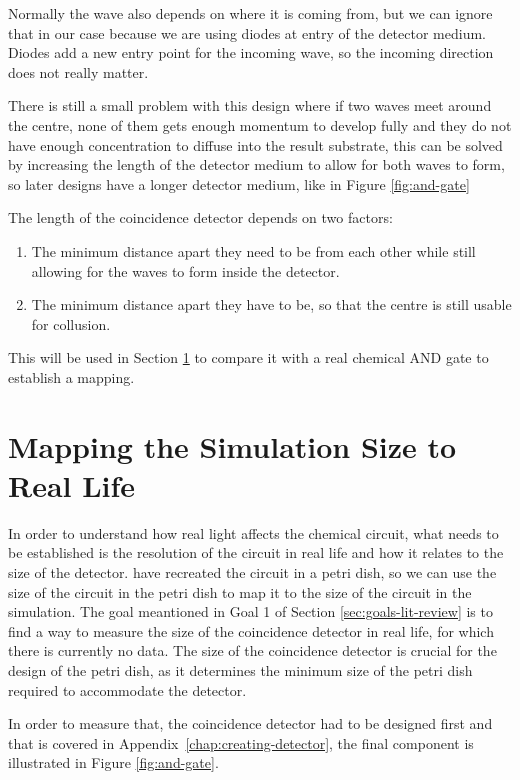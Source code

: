 Normally the wave also depends on where it is coming from, but we can ignore that in our case because we are using diodes at entry of the detector medium. Diodes add a new entry point for the incoming wave, so the incoming direction does not really matter. 

There is still a small problem with this design where if two waves meet around the centre, none of them gets enough momentum to develop fully and they do not have enough concentration to diffuse into the result substrate, this can be solved by increasing the length of the detector medium to allow for both waves to form, so later designs have a longer detector medium, like in Figure \ref{fig:and-gate}

The length of the coincidence detector depends on two factors:
\begin{enumerate}
    \item The minimum distance apart they need to be from each other while still allowing for the waves to form inside the detector.
    \item The minimum distance apart they have to be, so that the centre is still usable for collusion.
\end{enumerate}

This will be used in Section \ref{sec:mapping-simulation-to-real-life} to compare it with a real chemical AND gate to establish a mapping.

\section{Mapping the Simulation Size to Real Life} \label{sec:mapping-simulation-to-real-life}
In order to understand how real light affects the chemical circuit, what needs to be established is the resolution of the circuit in real life and how it relates to the size of the detector. \cite{gorecki2003chemical} have recreated the circuit in a petri dish, so we can use the size of the circuit in the petri dish to map it to the size of the circuit in the simulation.
The goal meantioned in Goal 1 of Section \ref{sec:goals-lit-review} is to find a way to measure the size of the coincidence detector in real life, for which there is currently no data. The size of the coincidence detector is crucial for the design of the petri dish, as it determines the minimum size of the petri dish required to accommodate the detector. 

In order to measure that, the coincidence detector had to be designed first and that is covered in Appendix~\ref{chap:creating-detector}, the final component is illustrated in Figure \ref{fig:and-gate}.


